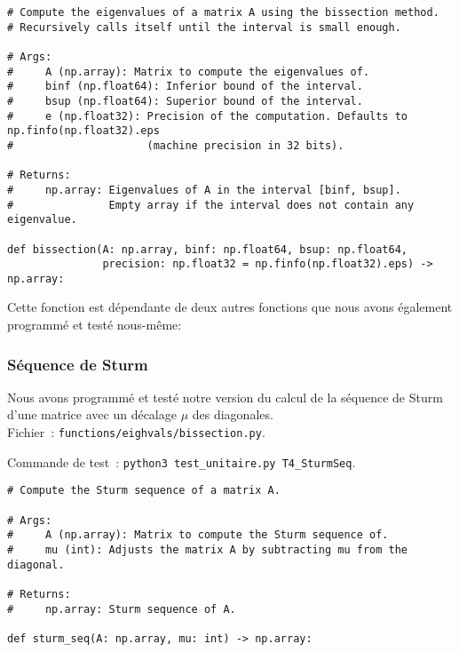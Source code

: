\documentclass{article}
\begin{document}
\begin{small}
\begin{verbatim}
# Compute the eigenvalues of a matrix A using the bissection method. 
# Recursively calls itself until the interval is small enough.

# Args:
#     A (np.array): Matrix to compute the eigenvalues of.
#     binf (np.float64): Inferior bound of the interval.
#     bsup (np.float64): Superior bound of the interval.
#     e (np.float32): Precision of the computation. Defaults to np.finfo(np.float32).eps 
#                     (machine precision in 32 bits).

# Returns:
#     np.array: Eigenvalues of A in the interval [binf, bsup]. 
#               Empty array if the interval does not contain any eigenvalue.

def bissection(A: np.array, binf: np.float64, bsup: np.float64, 
               precision: np.float32 = np.finfo(np.float32).eps) -> np.array:
\end{verbatim}
\end{small}

Cette fonction est dépendante de deux autres fonctions que nous avons également programmé et testé nous-même:

\subsubsection{Séquence de Sturm}

Nous avons programmé et testé notre version du calcul de la séquence de Sturm d'une matrice avec un décalage $\mu$ des diagonales. \\

Fichier~: \texttt{functions/eighvals/bissection.py}.

Commande de test~: \texttt{python3 test\_unitaire.py T4\_SturmSeq}.

\begin{small}
\begin{verbatim}
# Compute the Sturm sequence of a matrix A.

# Args:
#     A (np.array): Matrix to compute the Sturm sequence of.
#     mu (int): Adjusts the matrix A by subtracting mu from the diagonal.

# Returns:
#     np.array: Sturm sequence of A.

def sturm_seq(A: np.array, mu: int) -> np.array:
\end{verbatim}
\end{small}
\end{document}
